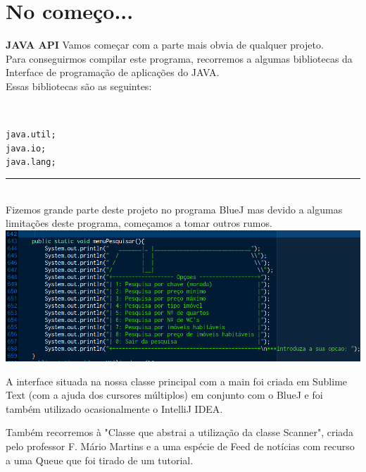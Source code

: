 \documentclass[12pt]{article}
\newenvironment{code}                    
{\textbf{
} \hspace{1cm} \hrulefill \\ 
\smallskip 
\begin{center}
\begin{minipage}{0.9\textwidth} 
\begin{alltt}\small}
{\end{alltt}
\end{minipage}
\end{center}
\hrule\smallskip
}
\begin{document}

\pagebreak

\section{No começo...}

\textbf{JAVA API}
\newline
Vamos começar com a parte mais obvia de qualquer projeto.\\
Para conseguirmos compilar este programa, recorremos a algumas bibliotecas da Interface de programação de aplicações do JAVA.\\
Essas bibliotecas são as seguintes:
\newline

\begin{code}
java.util;
java.io;
java.lang;

\end{code}
~\\

Fizemos grande parte deste projeto no programa BlueJ mas devido a algumas limitações deste programa, começamos a tomar outros rumos.
\newline
\newline
\includegraphics[scale=0.4]{002.png}	 
\newline
\newline

A interface situada na nossa classe principal com a main foi criada em Sublime Text (com a ajuda dos cursores múltiplos) em conjunto com o BlueJ e foi também utilizado ocasionalmente o IntelliJ IDEA.
\newline

Também recorremos à "Classe que abstrai a utilização da classe Scanner", criada pelo professor F. Mário Martins e a uma espécie de Feed de notícias com recurso a uma Queue que foi tirado de um tutorial.
\newline
\newline
\newline
\end{document}
